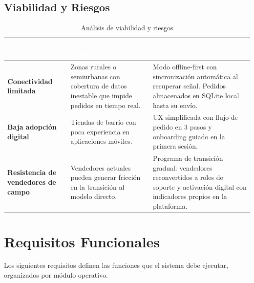\documentclass[12pt, a4paper]{report}
\begin{document}
\subsection{Viabilidad y Riesgos}

\begin{table}[ht]
\centering
\renewcommand{\arraystretch}{1.4}
\begin{tabularx}{\textwidth}{>{\bfseries}p{3cm} X X}
\toprule
\rowcolor{utplblue}
\textcolor{white}{\textbf{Barrera}} &
\textcolor{white}{\textbf{Descripción del riesgo}} &
\textcolor{white}{\textbf{Mitigación tecnológica}} \\
\midrule
\rowcolor{lightgray}
Conectividad limitada &
Zonas rurales o semiurbanas con cobertura de datos inestable que impide pedidos en tiempo real. &
Modo offline-first con sincronización automática al recuperar señal. Pedidos almacenados en SQLite local hasta su envío. \\
\rowcolor{white}
Baja adopción digital &
Tiendas de barrio con poca experiencia en aplicaciones móviles. &
UX simplificada con flujo de pedido en 3 pasos y onboarding guiado en la primera sesión. \\
\rowcolor{lightgray}
Resistencia de vendedores de campo &
Vendedores actuales pueden generar fricción en la transición al modelo directo. &
Programa de transición gradual: vendedores reconvertidos a roles de soporte y activación digital con indicadores propios en la plataforma. \\
\bottomrule
\end{tabularx}
\caption{Análisis de viabilidad y riesgos}
\end{table}


\section{Requisitos Funcionales}

Los siguientes requisitos definen las funciones que el sistema debe ejecutar, organizados por módulo operativo.
\end{document}
